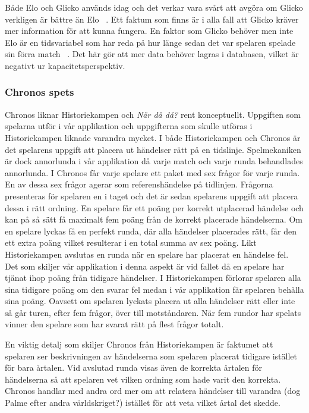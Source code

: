 \documentclass[a4paper, 11pt]{article}
\begin{document}
Både Elo och Glicko används idag och det verkar vara svårt att avgöra om Glicko verkligen är bättre än Elo ~\cite{stackchess}. Ett faktum som finns är i alla fall att Glicko kräver mer information för att kunna fungera. En faktor som Glicko behöver men inte Elo är en tidsvariabel som har reda på hur länge sedan det var spelaren spelade sin förra match ~\cite{glickoex}. Det här gör att mer data behöver lagras i databasen, vilket är negativt ur kapacitetsperspektiv.

\subsubsection{Chronos spets}
Chronos liknar Historiekampen och \textit{När då då?} rent konceptuellt. Uppgiften som spelarna utför i vår applikation och uppgifterna som skulle utföras i Historiekampen liknade varandra mycket. I både Historiekampen och Chronos är det spelarens uppgift att placera ut händelser rätt på en tidslinje. Spelmekaniken är dock annorlunda i vår applikation då varje match och varje runda behandlades annorlunda. I Chronos får varje spelare ett paket med sex frågor för varje runda. En av dessa sex frågor agerar som referenshändelse på tidlinjen. Frågorna presenteras för spelaren en i taget och det är sedan spelarens uppgift att placera dessa i rätt ordning. En spelare får ett poäng per korrekt utplacerad händelse och kan på så sätt få maximalt fem poäng från de korrekt placerade händelserna. Om en spelare lyckas få en perfekt runda, där alla händelser placerades rätt, får den ett extra poäng vilket resulterar i en total summa av sex poäng. Likt Historiekampen avslutas en runda när en spelare har placerat en händelse fel. Det som skiljer vår applikation i denna aspekt är vid fallet då en spelare har tjänat ihop poäng från tidigare händelser. I Historiekampen förlorar spelaren alla sina tidigare poäng om den svarar fel medan i vår applikation får spelaren behålla sina poäng. Oavsett om spelaren lyckats placera ut alla händelser rätt eller inte så går turen, efter fem frågor, över till motståndaren. När fem rundor har spelats vinner den spelare som har svarat rätt på flest frågor totalt.  

En viktig detalj som skiljer Chronos från Historiekampen är faktumet att spelaren ser beskrivningen av händelserna som spelaren placerat tidigare istället för bara årtalen. Vid avslutad runda visas även de korrekta årtalen för händelserna så att spelaren vet vilken ordning som hade varit den korrekta. Chronos handlar med andra ord mer om att relatera händelser till varandra (dog Palme efter andra världskriget?) istället för att veta vilket årtal det skedde.
\end{document}
